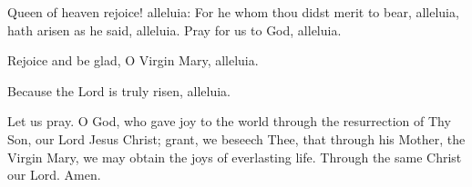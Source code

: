 \begin{enpars}\noindent Queen of heaven rejoice! alleluia:
For he whom thou didst merit to bear, alleluia,
hath arisen as he said, alleluia.
Pray for us to God, alleluia.

\noindent \vv Rejoice and be glad, O Virgin Mary, alleluia.

\noindent \rr Because the Lord is truly risen, alleluia.

\noindent Let us pray. O God, who gave joy to the world through the resurrection of Thy Son, our Lord Jesus Christ; grant, we beseech Thee, that through his Mother, the Virgin Mary, we may obtain the joys of everlasting life. Through the same Christ our Lord. Amen.
\end{enpars}